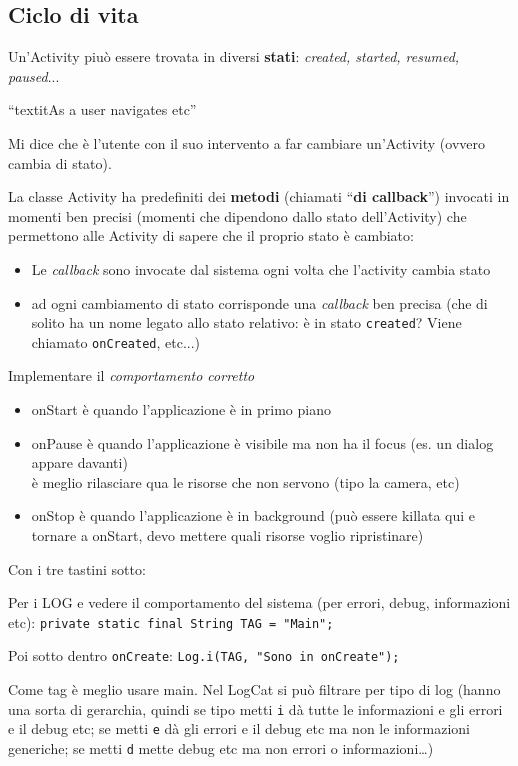 \subsection{Ciclo di vita}
\par Un'Activity piuò essere trovata in diversi \textbf{stati}: \textit{created, started, resumed, paused}...
\par ``textit{As a user navigates etc}''
\par Mi dice che è l'utente con il suo intervento a far cambiare un'Activity (ovvero cambia di stato).
\par La classe Activity ha predefiniti dei \textbf{metodi} (chiamati ``\textbf{di callback}'') invocati in momenti ben precisi (momenti che dipendono dallo stato dell'Activity) che permettono alle Activity di sapere che il proprio stato è cambiato:
\begin{itemize}
    \item Le \textit{callback} sono invocate dal sistema ogni volta che l'activity cambia stato
    \item ad ogni cambiamento di stato corrisponde una \textit{callback} ben precisa (che di solito ha un nome legato allo stato relativo: è in stato \texttt{created}? Viene chiamato \texttt{onCreated}, etc...)
\end{itemize}
\par Implementare il \textit{comportamento corretto} %
\begin{itemize}
    \item onStart è quando l'applicazione è in primo piano
    \item onPause è quando l'applicazione è visibile ma non ha il focus (es. un dialog appare davanti)\\
    è meglio rilasciare qua le risorse che non servono (tipo la camera, etc)
    \item onStop è quando l'applicazione è in background (può essere killata qui e tornare a onStart, devo mettere quali risorse voglio ripristinare)
\end{itemize}
\par Con i tre tastini sotto:

\par Per i LOG e vedere il comportamento del sistema (per errori, debug, informazioni etc): \texttt{private static final String TAG = "Main";}
\par Poi sotto dentro \texttt{onCreate}: \texttt{Log.i(TAG, "Sono in onCreate");}
\par Come tag è meglio usare main. Nel LogCat si può filtrare per tipo di log (hanno una sorta di gerarchia, quindi se tipo metti \texttt{i} dà tutte le informazioni e gli errori e il debug etc; se metti \texttt{e} dà gli errori e il debug etc ma non le informazioni generiche; se metti \texttt{d} mette debug etc ma non errori o informazioni\dots)


